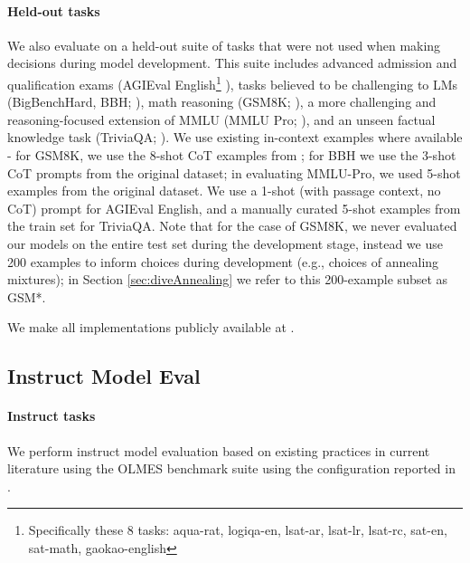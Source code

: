\documentclass[table]{ai2style/ai2}
\begin{document}
\paragraph{Held-out tasks} We also evaluate on a held-out suite of tasks that were not used when making decisions during model development. 
This suite includes advanced admission and qualification exams (AGIEval English\footnote{Specifically these 8 tasks: aqua-rat, logiqa-en, lsat-ar, lsat-lr, lsat-rc, sat-en, sat-math, gaokao-english} \citep{zhong-etal-2024-agieval}), tasks believed to be challenging to LMs (BigBenchHard, BBH; \citealp{suzgun2022challengingbigbenchtaskschainofthought}), math reasoning (GSM8K; \citealp{cobbe2021trainingverifierssolvemath}), a more challenging and reasoning-focused extension of MMLU (MMLU Pro; \citealp{wang2024mmlu}), and an unseen factual knowledge task (TriviaQA; \citealp{joshi-etal-2017-triviaqa}). We use existing in-context examples where available - for GSM8K, we use the 8-shot CoT examples from \citet{wei2023chainofthoughtpromptingelicitsreasoning}; for BBH we use the 3-shot CoT prompts from the original dataset; in evaluating MMLU-Pro, we used 5-shot examples from the original dataset. We use a 1-shot (with passage context, no CoT) prompt for AGIEval English, and a manually curated 5-shot examples from the train set for TriviaQA. Note that for the case of GSM8K, we never evaluated our models on the entire test set during the development stage, instead we use 200 examples to inform choices during development (e.g., choices of annealing mixtures); in Section \ref{sec:diveAnnealing} we refer to this 200-example subset as GSM*. 

We make all implementations publicly available at \href{https://github.com/allenai/olmes}{}.

\subsection{Instruct Model Eval}
\label{app:eval-post}

\paragraph{Instruct tasks} 
We perform instruct model evaluation based on existing practices in current literature using the OLMES benchmark suite \citep{olmes} using the configuration reported in \citet{lambert2024tulu3}. 
\end{document}
